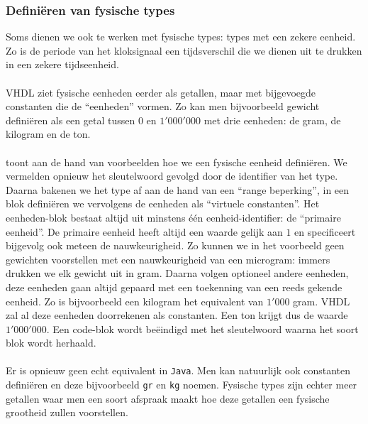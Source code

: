 \subsubsection{Defini\"eren van fysische types}

Soms dienen we ook te werken met fysische types: types met een zekere eenheid. Zo is de periode van het kloksignaal een tijdsverschil die we dienen uit te drukken in een zekere tijdseenheid.

\paragraph{}
VHDL ziet fysische eenheden eerder als getallen, maar met bijgevoegde constanten die de ``eenheden'' vormen. Zo kan men bijvoorbeeld gewicht defini\"eren als een getal tussen $0$ en $1'000'000$ met drie eenheden: de gram, de kilogram en de ton.

\paragraph{}
 toont aan de hand van voorbeelden hoe we een fysische eenheid defini\"eren. We vermelden opnieuw het sleutelwoord  gevolgd door de identifier van het type. Daarna bakenen we het type af aan de hand van een ``range beperking'', in een  blok defini\"eren we vervolgens de eenheden als ``virtuele constanten''. Het eenheden-blok bestaat altijd uit minstens \'e\'en eenheid-identifier: de ``primaire eenheid''. De primaire eenheid heeft altijd een waarde gelijk aan $1$ en specificeert bijgevolg ook meteen de nauwkeurigheid. Zo kunnen we in het voorbeeld geen gewichten voorstellen met een nauwkeurigheid van een microgram: immers drukken we elk gewicht uit in gram. Daarna volgen optioneel andere eenheden, deze eenheden gaan altijd gepaard met een toekenning van een reeds gekende eenheid. Zo is bijvoorbeeld een kilogram het equivalent van $1'000$ gram. VHDL zal al deze eenheden doorrekenen als constanten. Een ton krijgt dus de waarde $1'000'000$. Een code-blok wordt be\"eindigd met het  sleutelwoord waarna het soort blok wordt herhaald.


\paragraph{}
Er is opnieuw geen echt equivalent in \texttt{Java}. Men kan natuurlijk ook constanten defini\"eren en deze bijvoorbeeld \texttt{gr} en \texttt{kg} noemen. Fysische types zijn echter meer getallen waar men een soort afspraak maakt hoe deze getallen een fysische grootheid zullen voorstellen.


